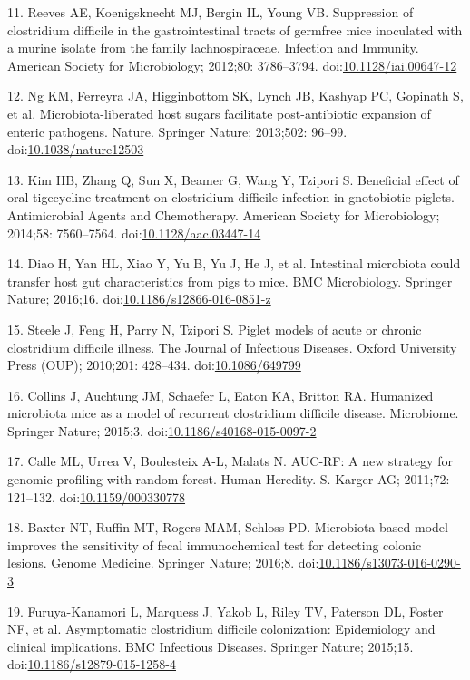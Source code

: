 \documentclass[11pt,]{article}
\begin{document}
11. Reeves AE, Koenigsknecht MJ, Bergin IL, Young VB. Suppression of
clostridium difficile in the gastrointestinal tracts of germfree mice
inoculated with a murine isolate from the family lachnospiraceae.
Infection and Immunity. American Society for Microbiology; 2012;80:
3786--3794.
doi:\href{http://dx.doi.org/10.1128/iai.00647-12}{10.1128/iai.00647-12}

12. Ng KM, Ferreyra JA, Higginbottom SK, Lynch JB, Kashyap PC, Gopinath
S, et al. Microbiota-liberated host sugars facilitate post-antibiotic
expansion of enteric pathogens. Nature. Springer Nature; 2013;502:
96--99.
doi:\href{http://dx.doi.org/10.1038/nature12503}{10.1038/nature12503}

13. Kim HB, Zhang Q, Sun X, Beamer G, Wang Y, Tzipori S. Beneficial
effect of oral tigecycline treatment on clostridium difficile infection
in gnotobiotic piglets. Antimicrobial Agents and Chemotherapy. American
Society for Microbiology; 2014;58: 7560--7564.
doi:\href{http://dx.doi.org/10.1128/aac.03447-14}{10.1128/aac.03447-14}

14. Diao H, Yan HL, Xiao Y, Yu B, Yu J, He J, et al. Intestinal
microbiota could transfer host gut characteristics from pigs to mice.
BMC Microbiology. Springer Nature; 2016;16.
doi:\href{http://dx.doi.org/10.1186/s12866-016-0851-z}{10.1186/s12866-016-0851-z}

15. Steele J, Feng H, Parry N, Tzipori S. Piglet models of acute or
chronic clostridium difficile illness. The Journal of Infectious
Diseases. Oxford University Press (OUP); 2010;201: 428--434.
doi:\href{http://dx.doi.org/10.1086/649799}{10.1086/649799}

16. Collins J, Auchtung JM, Schaefer L, Eaton KA, Britton RA. Humanized
microbiota mice as a model of recurrent clostridium difficile disease.
Microbiome. Springer Nature; 2015;3.
doi:\href{http://dx.doi.org/10.1186/s40168-015-0097-2}{10.1186/s40168-015-0097-2}

17. Calle ML, Urrea V, Boulesteix A-L, Malats N. AUC-RF: A new strategy
for genomic profiling with random forest. Human Heredity. S. Karger AG;
2011;72: 121--132.
doi:\href{http://dx.doi.org/10.1159/000330778}{10.1159/000330778}

18. Baxter NT, Ruffin MT, Rogers MAM, Schloss PD. Microbiota-based model
improves the sensitivity of fecal immunochemical test for detecting
colonic lesions. Genome Medicine. Springer Nature; 2016;8.
doi:\href{http://dx.doi.org/10.1186/s13073-016-0290-3}{10.1186/s13073-016-0290-3}

19. Furuya-Kanamori L, Marquess J, Yakob L, Riley TV, Paterson DL,
Foster NF, et al. Asymptomatic clostridium difficile colonization:
Epidemiology and clinical implications. BMC Infectious Diseases.
Springer Nature; 2015;15.
doi:\href{http://dx.doi.org/10.1186/s12879-015-1258-4}{10.1186/s12879-015-1258-4}
\end{document}
